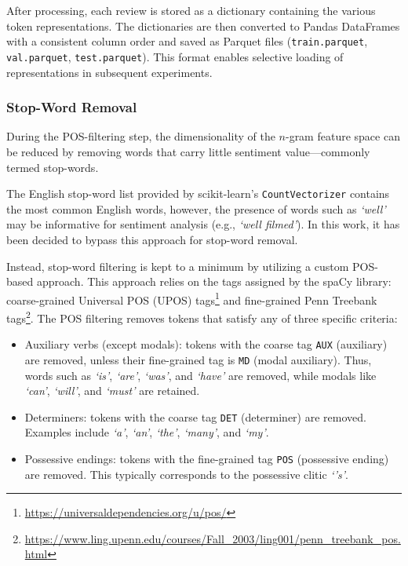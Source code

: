 \documentclass[a4paper,fleqn]{cas-dc}
\newcommand{\postag}[1]{\texttt{#1}}
\newcommand{\code}[1]{\texttt{#1}}
\newcommand{\literal}[1]{\textit{`#1'}}
\begin{document}
After processing, each review is stored as a dictionary containing the various token representations. The dictionaries are then converted to Pandas DataFrames with a consistent column order and saved as Parquet files (\code{train.parquet}, \code{val.parquet}, \code{test.parquet}). This format enables selective loading of representations in subsequent experiments.

\subsubsection{Stop-Word Removal}
\label{sec:stop-word-removal}

During the POS-filtering step, the dimensionality of the $n$-gram feature space can be reduced by removing words that carry little sentiment value---commonly termed stop-words.

The English stop-word list provided by scikit-learn's \code{CountVectorizer} contains the most common English words, however, the presence of words such as \literal{well} may be informative for sentiment analysis (e.g., \literal{well filmed}). In this work, it has been decided to bypass this approach for stop-word removal.

Instead, stop-word filtering is kept to a minimum by utilizing a custom POS-based approach. This approach relies on the tags assigned by the spaCy library: coarse-grained Universal POS (UPOS) tags\footnote{\url{https://universaldependencies.org/u/pos/}} and fine-grained Penn Treebank tags\footnote{\url{https://www.ling.upenn.edu/courses/Fall_2003/ling001/penn_treebank_pos.html}}. The POS filtering removes tokens that satisfy any of three specific criteria:

\begin{itemize}
	\item {Auxiliary verbs (except modals)}: tokens with the coarse tag \postag{AUX} (auxiliary) are removed, unless their fine-grained tag is \postag{MD} (modal auxiliary). Thus, words such as \literal{is}, \literal{are}, \literal{was}, and \literal{have} are removed, while modals like \literal{can}, \literal{will}, and \literal{must} are retained.
	\item {Determiners}: tokens with the coarse tag \postag{DET} (determiner) are removed. Examples include \literal{a}, \literal{an}, \literal{the}, \literal{many}, and \literal{my}.
	\item {Possessive endings}: tokens with the fine-grained tag \postag{POS} (possessive ending) are removed. This typically corresponds to the possessive clitic \literal{'s}.
\end{itemize}
\end{document}
